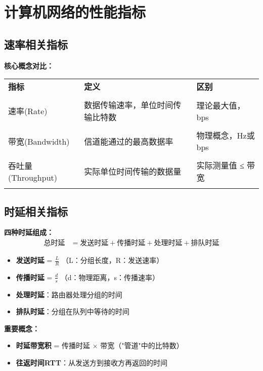 \documentclass[lang=cn,newtx,10pt,scheme=chinese]{../../elegantbook}
\begin{document}
\section{计算机网络的性能指标}

\subsection{速率相关指标}

\textbf{核心概念对比：}
\begin{longtable}{@{}p{2.5cm}p{5cm}p{6cm}@{}}
\toprule
\textbf{指标} & \textbf{定义} & \textbf{区别} \\\\ \midrule
\endhead

速率(Rate) & 数据传输速率，单位时间传输比特数 & 理论最大值，bps \\\\
带宽(Bandwidth) & 信道能通过的最高数据率 & 物理概念，Hz或bps \\\\
吞吐量(Throughput) & 实际单位时间传输的数据量 & 实际测量值 ≤ 带宽 \\\\

\bottomrule
\end{longtable}

\subsection{时延相关指标}

\textbf{四种时延组成：}
\begin{align}
\text{总时延} &= \text{发送时延} + \text{传播时延} + \text{处理时延} + \text{排队时延}
\end{align}

\begin{itemize}
  \item \textbf{发送时延} = $\frac{L}{R}$ （L：分组长度，R：发送速率）
  \item \textbf{传播时延} = $\frac{d}{s}$ （d：物理距离，s：传播速率）
  \item \textbf{处理时延}：路由器处理分组的时间
  \item \textbf{排队时延}：分组在队列中等待的时间
\end{itemize}

\textbf{重要概念：}
\begin{itemize}
  \item \textbf{时延带宽积} = 传播时延 × 带宽（"管道"中的比特数）
  \item \textbf{往返时间RTT}：从发送方到接收方再返回的时间
\end{itemize}
\end{document}
